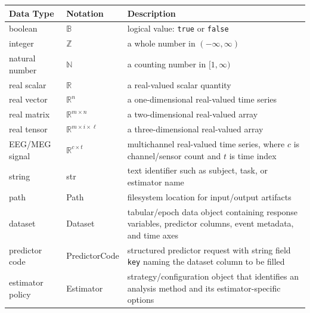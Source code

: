 \documentclass[12pt, titlepage]{article}
\begin{document}
\begin{center}
\renewcommand{\arraystretch}{1.2}
\noindent 
\begin{tabular}{l l p{7.5cm}} 
\toprule 
\textbf{Data Type} & \textbf{Notation} & \textbf{Description}\\ 
\midrule
boolean & $\mathbb{B}$ & logical value: \texttt{true} or \texttt{false}\\
integer & $\mathbb{Z}$ & a whole number in $(-\infty, \infty)$\\
natural number & $\mathbb{N}$ & a counting number in $[1, \infty)$\\
real scalar & $\mathbb{R}$ & a real-valued scalar quantity\\
real vector & $\mathbb{R}^{n}$ & a one-dimensional real-valued time series\\
real matrix & $\mathbb{R}^{m \times n}$ & a two-dimensional real-valued array\\
real tensor & $\mathbb{R}^{m \times i \times \ell}$ & a three-dimensional real-valued array\\
EEG/MEG signal & $\mathbb{R}^{c \times t}$ & multichannel real-valued time series, where $c$ is channel/sensor count and $t$ is time index\\
string & str & text identifier such as subject, task, or estimator name\\
path & Path & filesystem location for input/output artifacts\\
dataset & Dataset & tabular/epoch data object containing response variables, predictor columns, event metadata, and time axes\\
predictor code & PredictorCode & structured predictor request with string field \texttt{key} naming the dataset column to be filled\\
estimator policy & Estimator & strategy/configuration object that identifies an analysis method and its estimator-specific options\\
\bottomrule
\end{tabular} 
\end{center}
\end{document}

